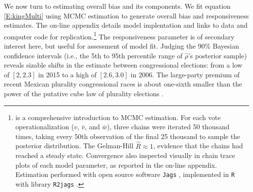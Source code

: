 \documentclass[letter,12pt]{article}
\begin{document}
{We now turn to estimating overall bias and its components. We fit equation \ref{E:kingMulti} using MCMC estimation to generate overall bias and responsiveness estimates. The on-line appendix details model implentation and links to data and computer code for replication.\footnote{\citet{gelman.hill.2007} is a comprehensive introduction to MCMC estimation. For each vote operationalization ($v$, $\bar{v}$, and $\bar{w}$), three chains were iterated 50 thousand times, taking every 50th observation of the final 25 thousand to sample the posterior distribution. The Gelman-Hill $\hat{R} \approx 1$, evidence that the chains had reached a steady state. Convergence also inspected visually in chain trace plots of each model parameter, as reported in the on-line appendix. Estimation performed with open source software \texttt{Jags} \citep{jags.cite}, implemented in \texttt{R} \citep{r.cite} with library \texttt{R2jags} \citep{r.r2jags}.} The responsiveness parameter is of secondary interest here, but useful for assessment of model fit. Judging the 90\% Bayesian confidence intervals (i.e., the 5th to 95th percentile range of $\hat{\rho}$'s posterior sample) reveals sizable shifts in the estimate between congressional elections: from a low of $[2,2.3]$ in 2015 to a high of $[2.6,3.0]$ in 2006. The large-party premium of recent Mexican plurality congressional races is about one-sixth smaller than the power of the putative cube law of plurality elections \citep{taagepera.CubeLaw.1973}. 



}
\end{document}
